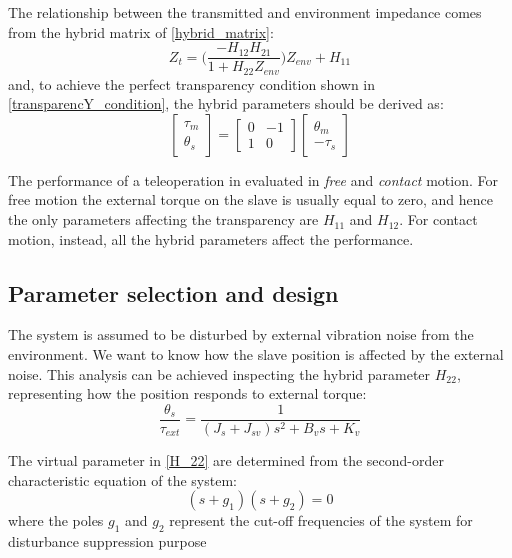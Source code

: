 The relationship between the transmitted and environment impedance comes from the hybrid matrix of \eqref{hybrid_matrix}:
\begin{equation}
	Z_t = \big(\dfrac{-H_{12} H_{21}}{1 + H_{22} Z_{env}}\big)Z_{env} + H_{11}
\end{equation}
and, to achieve the perfect transparency condition shown in \eqref{transparencY_condition}, the hybrid parameters should be derived as:
\begin{equation}
	\begin{bmatrix}
	\tau_m \\ \theta_s
	\end{bmatrix} = 
	\begin{bmatrix}
	0 & -1 \\ 1 & 0
	\end{bmatrix}
	\begin{bmatrix}
	\theta_m \\ -\tau_s
	\end{bmatrix}
\end{equation}

The performance of a teleoperation in evaluated in \emph{free} and \emph{contact} motion. For free motion the external torque on the slave is usually equal to zero, and hence the only parameters affecting the transparency are $ H_{11} $ and $ H_{12} $. For contact motion, instead, all the hybrid parameters affect the performance.

\subsection{Parameter selection and design}\label{ParamSelect} 

The system is assumed to be disturbed by external vibration noise from the environment. We want to know how the slave position is affected by the external noise. This analysis can be achieved inspecting the hybrid parameter $ H_{22} $, representing how the position responds to external torque:
\begin{equation}
	\dfrac{\theta_s}{\tau_{ext}} = \dfrac{1}{(J_s + J_{sv}) s^2 + B_v s + K_v}
	\label{H_22}
\end{equation}

The virtual parameter in \eqref{H_22} are determined from the second-order characteristic equation of the system:
\begin{equation}
	(s + g_1)(s + g_2) = 0
	\label{charact_equation}
\end{equation}  
where the poles $ g_1 $ and $ g_2 $ represent the cut-off frequencies of the system for disturbance suppression purpose

